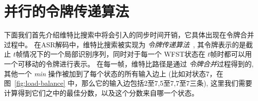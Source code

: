 \section{并行的令牌传递算法}
\label{sec:atomic}

下面我们首先介绍维特比搜索中将会引入的同步时间开销，它具体出现在令牌合并过程中。
%
%
在ASR解码中，维特比搜索被实现为 \textit{令牌传递算法}~\cite{woodland19951994}, 其令牌表示的是截止 $t$帧情况下的一个局部识别序列，同时对于每一个 WFST状态在 $t$帧时都可以用一个可移动的令牌进行表示。
在每一帧，维特比路径是通过 \textit{令牌合并}过程得到的, 其他一个 \textit{min} 操作被加到了每个状态的所有输入边上 (比如对状态7，在图~\ref{fig:load-balance} 中，那么它的输入边包括2至7,5至7,7至7三条), 这里我们需要计算得到它们之中的最佳分数，以及这个分数来自哪一个状态。


